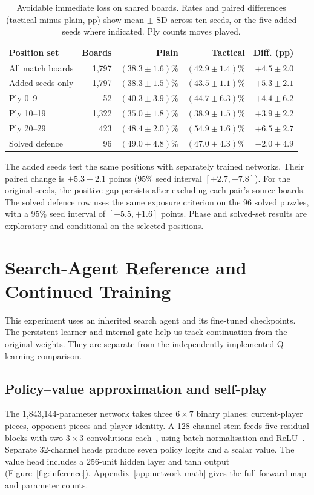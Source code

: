 \documentclass[letterpaper]{article}
\begin{document}
\begin{table}[!htbp]
\centering\small
\caption{Avoidable immediate loss on shared boards. Rates and paired differences (tactical minus plain, pp) show mean $\pm$ SD across ten seeds, or the five added seeds where indicated. Ply counts moves played.}
\label{tab:matched-defence}
\begin{tabular}{@{}lrrrr@{}}
\toprule
Position set & Boards & Plain & Tactical & Diff. (pp)\\
\midrule
All match boards & 1,797 & $(38.3\pm1.6)\%$ & $(42.9\pm1.4)\%$ & $+4.5\pm2.0$\\
Added seeds only & 1,797 & $(38.3\pm1.5)\%$ & $(43.5\pm1.1)\%$ & $+5.3\pm2.1$\\
Ply 0--9 & 52 & $(40.3\pm3.9)\%$ & $(44.7\pm6.3)\%$ & $+4.4\pm6.2$\\
Ply 10--19 & 1,322 & $(35.0\pm1.8)\%$ & $(38.9\pm1.5)\%$ & $+3.9\pm2.2$\\
Ply 20--29 & 423 & $(48.4\pm2.0)\%$ & $(54.9\pm1.6)\%$ & $+6.5\pm2.7$\\
Solved defence & 96 & $(49.0\pm4.8)\%$ & $(47.0\pm4.3)\%$ & $-2.0\pm4.9$\\
\bottomrule
\end{tabular}
\end{table}

The added seeds test the same positions with separately trained networks.
Their paired change is $+5.3\pm2.1$ points (95\% seed interval $[+2.7,+7.8]$).
For the original seeds, the positive gap persists after excluding each
pair's source boards. The solved defence row uses the same exposure
criterion on the 96 solved puzzles, with a 95\% seed interval of
$[-5.5,+1.6]$ points. Phase and solved-set results are
exploratory and conditional on the selected positions.

\clearpage
\section{Search-Agent Reference and Continued Training}
\label{app:search-study}
This experiment uses an inherited search agent and its fine-tuned
checkpoints. The persistent learner and internal gate help us track
continuation from the original weights. They are separate from the
independently implemented Q-learning comparison.

\subsection{Policy--value approximation and self-play}
The 1,843,144-parameter network takes three $6\times7$ binary planes: current-player
pieces, opponent pieces and player identity. A 128-channel stem feeds five
residual blocks with two $3\times3$ convolutions each~\cite{he2016}, using batch
normalisation and ReLU~\cite{ioffe2015}. Separate 32-channel heads produce seven
policy logits and a scalar value. The value head includes a 256-unit hidden layer
and tanh output (Figure~\ref{fig:inference}). Appendix~\ref{app:network-math} gives the full forward map and
parameter counts.
\end{document}
